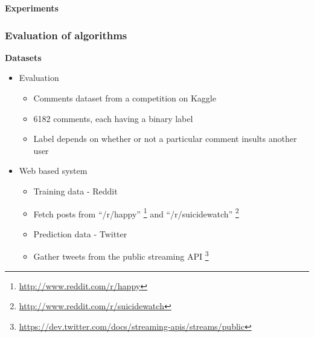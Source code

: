 \documentclass{beamer}
\begin{document}
    \begin{frame}
        \begin{center}
            \textbf{Experiments}
        \end{center}
    \end{frame}
    
    \begin{frame}
        \frametitle{Evaluation of algorithms}
        \begin{center}
            \textbf{Datasets}
        \end{center}
        \begin{itemize}
            \item{
            Evaluation
            \begin{itemize}
                \item{Comments dataset from a competition on Kaggle}
                \item{6182 comments, each having a binary label}
                \item{Label depends on whether or not a particular comment insults another user}
            \end{itemize}
            }
            \pause
            \item{
            Web based system
            \begin{itemize}
                \item{Training data - Reddit}
                \item{Fetch posts from ``/r/happy'' \footnote{\url{http://www.reddit.com/r/happy}} and ``/r/suicidewatch'' \footnote{\url{http://www.reddit.com/r/suicidewatch}}}
                \item{Prediction data - Twitter}
                \item{Gather tweets from the public streaming API \footnote{\url{https://dev.twitter.com/docs/streaming-apis/streams/public}}}
            \end{itemize}
            }
        \end{itemize}
    \end{frame}
    
\end{document}
